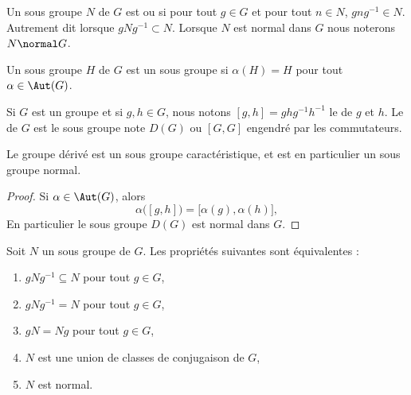 \begin{definition}
    Un sous groupe \( N\) de \( G\) est  ou  si pour tout \( g\in G\) et pour tout \( n\in N\), \( gng^{-1}\in N\). Autrement dit lorsque \( gNg^{-1}\subset N\). Lorsque \( N\) est normal dans \( G\) nous noterons \( N\normal G\).

    Un sous groupe \( H\) de \( G\) est un sous groupe  si \( \alpha(H)=H\) pour tout \( \alpha\in \Aut(G)\).
\end{definition}

Si \( G\) est un groupe et si \( g,h\in G\), nous notons \( [g,h]=ghg^{-1}h^{-1}\) le  de \( g\) et \( h\). Le  de \( G\) est le sous groupe note \( D(G)\) ou \( [G,G]\) engendré par les commutateurs.

\begin{proposition}
    Le groupe dérivé est un sous groupe caractéristique, et est en particulier un sous groupe normal.
\end{proposition}

\begin{proof}
    Si \( \alpha\in \Aut(G)\), alors
    \begin{equation}
        \alpha\big( [g,h] \big)=\big[ \alpha(g),\alpha(h) \big],
    \end{equation}
    En particulier le sous groupe \( D(G)\) est normal dans \( G\).
\end{proof}

\begin{proposition}
    Soit \( N\) un sous groupe de \( G\). Les propriétés suivantes sont équivalentes :
    \begin{enumerate}
        \item
            \( gNg^{-1}\subseteq N\) pour tout \( g\in G\),
        \item
            \( gNg^{-1}= N\) pour tout \( g\in G\),
        \item
            \( gN=Ng\) pour tout \( g\in G\),
        \item
            \( N\) est une union de classes de conjugaison de \( G\),
        \item
            \( N\) est normal.
    \end{enumerate}
\end{proposition}

